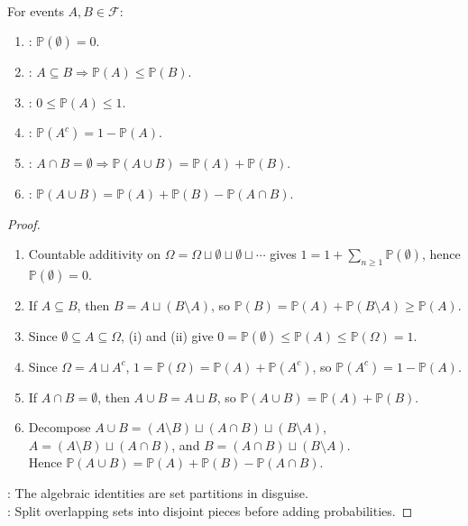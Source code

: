 \begin{proposition} \label{prop:probability-axiom-consequences} \\
For events $A,B\in\mathcal{F}$:
\begin{enumerate}[label=(\roman*)]
\setlength{\itemsep}{0pt}
\item {}: $\mathbb{P}(\emptyset)=0$.
\item {}: $A\subseteq B\Rightarrow\mathbb{P}(A)\leq\mathbb{P}(B)$.
\item {}: $0\leq\mathbb{P}(A)\leq1$.
\item {}: $\mathbb{P}(A^c)=1-\mathbb{P}(A)$.
\item {}: $A\cap B=\emptyset\Rightarrow\mathbb{P}(A\cup B)=\mathbb{P}(A)+\mathbb{P}(B)$.
\item {}: $\mathbb{P}(A\cup B)=\mathbb{P}(A)+\mathbb{P}(B)-\mathbb{P}(A\cap B)$.
\end{enumerate}
\begin{proof}
\begin{enumerate}[label=(\roman*)]
\setlength{\itemsep}{0pt}
\item Countable additivity on $\Omega=\Omega\sqcup\emptyset\sqcup\emptyset\sqcup\cdots$ gives $1=1+\sum\limits_{n\geq1}\mathbb{P}(\emptyset)$, hence $\mathbb{P}(\emptyset)=0$.
\item If $A\subseteq B$, then $B=A\sqcup(B\setminus A)$, so $\mathbb{P}(B)=\mathbb{P}(A)+\mathbb{P}(B\setminus A)\geq\mathbb{P}(A)$.
\item Since $\emptyset\subseteq A\subseteq\Omega$, (i) and (ii) give $0=\mathbb{P}(\emptyset)\leq\mathbb{P}(A)\leq\mathbb{P}(\Omega)=1$.
\item Since $\Omega=A\sqcup A^c$, $1=\mathbb{P}(\Omega)=\mathbb{P}(A)+\mathbb{P}(A^c)$, so $\mathbb{P}(A^c)=1-\mathbb{P}(A)$.
\item If $A\cap B=\emptyset$, then $A\cup B=A\sqcup B$, so $\mathbb{P}(A\cup B)=\mathbb{P}(A)+\mathbb{P}(B)$.
\item Decompose $A\cup B=(A\setminus B)\sqcup(A\cap B)\sqcup(B\setminus A)$, $A=(A\setminus B)\sqcup(A\cap B)$, and $B=(A\cap B)\sqcup(B\setminus A)$.\\
Hence $\mathbb{P}(A\cup B)=\mathbb{P}(A)+\mathbb{P}(B)-\mathbb{P}(A\cap B)$.
\end{enumerate}
: The algebraic identities are set partitions in disguise.\\
: Split overlapping sets into disjoint pieces before adding probabilities.
\end{proof}
\end{proposition}


